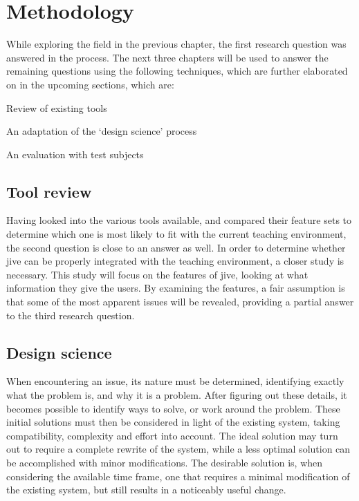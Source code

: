 \chapter{Methodology}\label{methodology}

While exploring the field in the previous chapter, the first research question was answered in the process.
The next three chapters will be used to answer the remaining questions using the following techniques, which are further elaborated on in the upcoming sections, which are:

\begin{itemize*}
	\item{Review of existing tools}
	\item{An adaptation of the `design science' process}%
	\item{An evaluation with test subjects}
\end{itemize*}

\section{Tool review}\label{methReview}

Having looked into the various tools available, and compared their feature sets to determine which one is most likely to fit with the current teaching environment, the second question is close to an answer as well.
In order to determine whether \gls{jive} can be properly integrated with the teaching environment, a closer study is necessary.
This study will focus on the features of \gls{jive}, looking at what information they give the users.
By examining the features, a fair assumption is that some of the most apparent issues will be revealed, providing a partial answer to the third research question.

\section{Design science}\label{methDesign}


When encountering an issue, its nature must be determined, identifying exactly what the problem is, and why it is a problem.
After figuring out these details, it becomes possible to identify ways to solve, or work around the problem.
These initial solutions must then be considered in light of the existing system, taking compatibility, complexity and effort into account.
The ideal solution may turn out to require a complete rewrite of the system, while a less optimal solution can be accomplished with minor modifications.
The desirable solution is, when considering the available time frame, one that requires a minimal modification of the existing system, but still results in a noticeably useful change.


